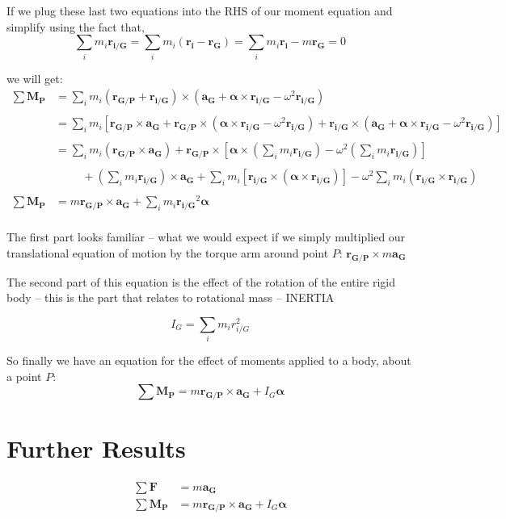 \documentclass[12pt,letterpaper,twoside]{report}
\begin{document}
If we plug these last two equations into the RHS of our moment equation and simplify using the fact that, 
\[ 
\displaystyle \sum_i m_i \bm{r_{i/G}} = \sum_i m_i (\bm{r_i} - \bm{r_{G}}) = \sum_i m_i \bm{r_i} - m \bm{r_{G}} = 0
\]

\newpage

we will get:
\begin{align*}
\sum \bm{M_P} &=  \sum_i m_i (\bm{r_{G/P}} + \bm{r_{i/G}}) \times (\bm{a_G} + \bm{\alpha} \times \bm{r_{i/G}} - \omega^2 \bm{r_{i/G}}) \\
\\
&=  \sum_i m_i [ \bm{r_{G/P}} \times \bm{a_G} + \bm{r_{G/P}} \times ( \bm{\alpha} \times \bm{r_{i/G}} - \omega^2 \bm{r_{i/G}}) + \bm{r_{i/G}} \times (\bm{a_G} + \bm{\alpha} \times \bm{r_{i/G}} - \omega^2 \bm{r_{i/G}})]\\
\\
&=  \sum_i m_i (\bm{r_{G/P}} \times \bm{a_G}) + \bm{r_{G/P}} \times [ \bm{\alpha} \times (\sum_i m_i \bm{r_{i/G}}) - \omega^2 (\sum_i m_i \bm{r_{i/G}})] \\
\\
&\hspace{1cm} + (\sum_i m_i \bm{r_{i/G}}) \times \bm{a_G} + \sum_i m_i [\bm{r_{i/G}} \times (\bm{\alpha} \times \bm{r_{i/G}})] - \omega^2 \sum_i m_i (\bm{r_{i/G}} \times \bm{r_{i/G}})\\
\\
\sum \bm{M_P} &= m  \bm{r_{G/P}} \times \bm{a_G}  + \sum_i m_i \bm{r_{i/G}}^2  \bm{\alpha}\\
\end{align*}

The first part looks familiar – what we would expect if we simply multiplied our translational equation of motion by the torque arm around point $P$: $\bm{r_{G/P}} \times m \bm{a_G}$

The second part of this equation is the effect of the rotation of the entire rigid body – this is the part that relates to rotational mass – INERTIA

\[
I_G = \sum_i m_i r_{i/G}^2
\]

So finally we have an equation for the effect of moments applied to a body, about a point $P$:
\[
\sum \bm{M_P} = m  \bm{r_{G/P}} \times \bm{a_G}  + I_G \bm{\alpha}
\]

\newpage

\section{Further Results}
\begin{align*}
\sum \bm{F} &= m \bm{a_G}\\
\sum \bm{M_P} &= m  \bm{r_{G/P}} \times \bm{a_G}  + I_G \bm{\alpha}\\
\end{align*}
\end{document}
